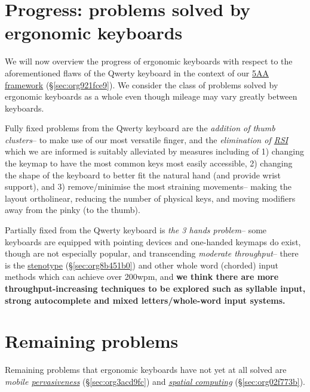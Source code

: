 \documentclass[logo,bsc,singlespacing,parskip]{infthesis}
\begin{document}
\section{Progress: problems solved by ergonomic keyboards}
\label{sec:org5f4c0cd}
We will now overview the progress of ergonomic keyboards with respect to the aforementioned flaws of the Qwerty keyboard in the context of our \hyperref[sec:org921fce9]{5AA framework} (\S  \ref{sec:org921fce9}).
We consider the class of problems solved by ergonomic keyboards as a whole even though mileage may vary greatly between keyboards.

Fully fixed problems from the Qwerty keyboard are the \emph{addition of thumb clusters}-- to make use of our most versatile finger,  and the \emph{elimination of \hyperref[orgdb95c62]{RSI}} which we are informed is suitably alleviated by measures including of 1) changing the keymap to have the most common keys most easily accessible, 2) changing the shape of the keyboard to better fit the natural hand (and provide wrist support), and 3) remove/minimise the most straining movements-- making the layout ortholinear, reducing the number of physical keys, and moving modifiers away from the pinky (to the thumb).

Partially fixed from the Qwerty keyboard is \emph{the 3 hands problem}-- some keyboards are equipped with pointing devices and one-handed keymaps do exist, though are not especially popular, and transcending \emph{moderate throughput}-- there is the  \hyperref[sec:org8b451b0]{stenotype} (\S  \ref{sec:org8b451b0}) and other whole word (chorded) input methods which can achieve over 200wpm, and \textbf{we think there are more throughput-increasing techniques to be explored such as syllable input, strong autocomplete and mixed letters/whole-word input systems.}

\section{Remaining problems}
\label{sec:orgc956688}
Remaining problems that ergonomic keyboards have not yet at all solved are \emph{mobile \hyperref[sec:org3acd9fc]{pervasiveness}} (\S  \ref{sec:org3acd9fc}) and \emph{\hyperref[sec:org02f773b]{spatial computing}} (\S  \ref{sec:org02f773b}).
\end{document}
